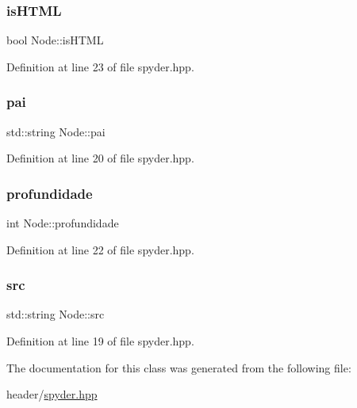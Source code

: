 \subsubsection{\texorpdfstring{is\+H\+T\+ML}{isHTML}}
{\footnotesize\ttfamily bool Node\+::is\+H\+T\+ML}



Definition at line 23 of file spyder.\+hpp.

\mbox{\label{class_node_ae6797ec35c3b1f6f2979a843c7e3264c}} 
\subsubsection{\texorpdfstring{pai}{pai}}
{\footnotesize\ttfamily std\+::string Node\+::pai}



Definition at line 20 of file spyder.\+hpp.

\mbox{\label{class_node_aa55ce33b2cf5a6d05435b1c8ca859e5d}} 
\subsubsection{\texorpdfstring{profundidade}{profundidade}}
{\footnotesize\ttfamily int Node\+::profundidade}



Definition at line 22 of file spyder.\+hpp.

\mbox{\label{class_node_a3289d1424d00ed56a69fbabfccb58e1a}} 
\subsubsection{\texorpdfstring{src}{src}}
{\footnotesize\ttfamily std\+::string Node\+::src}



Definition at line 19 of file spyder.\+hpp.



The documentation for this class was generated from the following file\+:\begin{DoxyCompactItemize}
\item 
header/\hyperlink{spyder_8hpp}{spyder.\+hpp}\end{DoxyCompactItemize}
